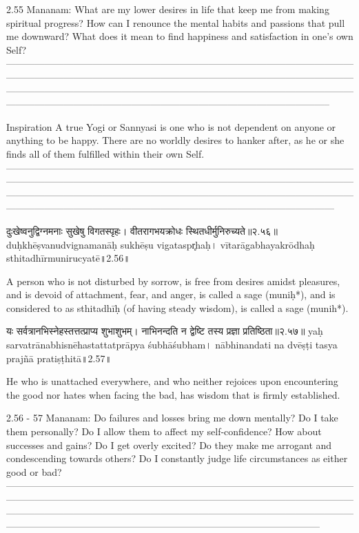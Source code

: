 2.55 Mananam:
What are my lower desires in life that keep me from making spiritual progress? How can I renounce the mental habits and passions that pull me downward? What does it mean to find happiness and satisfaction in one’s own Self?
—--------------------------------------------------------------------------------------------------------------------------------------------------------------------------------------------------------------------------------------------------------------------------------------------------------------------------------------------------------------------------------------------------------------------------------------
 

Inspiration
A true Yogi or Sannyasi is one who is not dependent on anyone or anything to be happy. There are no worldly desires to hanker after, as he or she finds all of them fulfilled within their own Self.
—---------------------------------------------------------------------------------------------------------------------------------------------------------------------------------------------------------------------------------------------------------------------------------------------------------------------------------------------------------------------------------------------------------------------------------------



दुःखेष्वनुद्विग्नमनाः सुखेषु विगतस्पृहः। 
वीतरागभयक्रोधः स्थितधीर्मुनिरुच्यते॥२.५६॥
duḥkhēṣvanudvignamanāḥ sukhēṣu vigataspr̥haḥ। 
vītarāgabhayakrōdhaḥ sthitadhīrmunirucyatē॥2.56॥

A person who is not disturbed by sorrow,  is free from desires amidst pleasures, and is devoid of attachment, fear, and anger, is called a sage (muniḥ*), and is considered to as sthitadhīḥ (of having steady wisdom), is called a sage (munih*).


यः सर्वत्रानभिस्नेहस्तत्तत्प्राप्य शुभाशुभम्। 
नाभिनन्दति न द्वेष्टि तस्य प्रज्ञा प्रतिष्ठिता॥२.५७॥
yaḥ sarvatrānabhisnēhastattatprāpya śubhāśubham। 
nābhinandati na dvēṣṭi tasya prajñā pratiṣṭhitā॥2.57॥

He who is unattached everywhere, and who neither rejoices upon encountering the good nor hates when facing the bad, has wisdom that is firmly established. 

2.56 - 57 Mananam: 
Do failures and losses bring me down mentally? Do I take them personally? Do I allow them to affect my self-confidence? How about successes and gains? Do I get overly excited? Do they make me arrogant and condescending towards others? Do I constantly judge life circumstances as either good or bad?
—-----------------------------------------------------------------------------------------------------------------------------------------------------------------------------------------------------------------------------------------------------------------------------------------------------------------------------------------------------------------------------------------------------------------------------------
 
